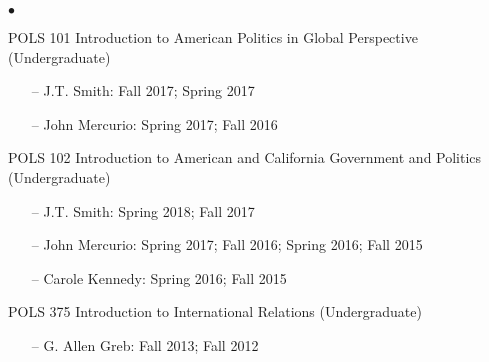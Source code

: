 \documentclass[letterpaper,12pt]{article}
\newenvironment{list2}{
  \begin{list}{$\bullet$}{%
      \setlength{\itemsep}{0in}
      \setlength{\parsep}{0in} 
      \setlength{\parskip}{0in}
      \setlength{\topsep}{0in} 
      \setlength{\partopsep}{0in}
      \setlength{\leftmargin}{1in}
      \setlength{\labelsep}{1em}
      \setlength{\labelwidth}{1em}
      \setlength{\itemindent}{-2em}
      \setlength{\listparindent}{2em}}}{\end{list}}
\begin{document}
\begin{list2}
    \item POLS 101 Introduction to American Politics in Global Perspective (Undergraduate)
        \begin{enumerate}[leftmargin=!,labelindent=0pt,itemindent=-15pt]
            \item[--] J.T. Smith: Fall 2017; Spring 2017
            \item[--] John Mercurio: Spring 2017; Fall 2016
        \end{enumerate}
    \item POLS 102 Introduction to American and California Government and Politics (Undergraduate)
        \begin{enumerate}[leftmargin=!,labelindent=0pt,itemindent=-15pt]
            \item[--] J.T. Smith: Spring 2018; Fall 2017
            \item[--] John Mercurio: Spring 2017; Fall 2016; Spring 2016; Fall 2015
            \item[--] Carole Kennedy: Spring 2016; Fall 2015
        \end{enumerate}
    \item POLS 375 Introduction to International Relations (Undergraduate)
        \begin{enumerate}[leftmargin=!,labelindent=0pt,itemindent=-15pt]
            \item[--] G. Allen Greb: Fall 2013; Fall 2012
        \end{enumerate}
\end{list2}

\end{document}
